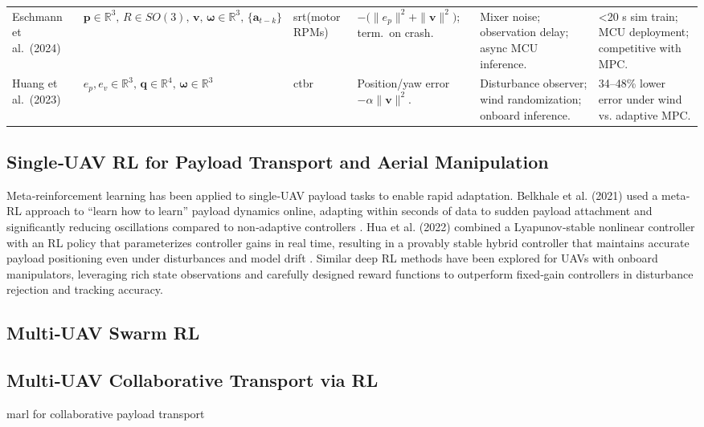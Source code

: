 \begin{table*}[hbt!]
\begin{tabular}{p{2.0cm}<{\raggedright} p{2.5cm}<{\raggedright} p{2.0cm}<{\raggedright} p{3.0cm}<{\raggedright} p{2.8cm}<{\raggedright} p{2.7cm}<{\raggedright}}
Eschmann et al.\ (2024) \cite{eschmann_learning_2024} & $\mathbf{p}\in\mathbb{R}^3,\,R\in SO(3),\,\mathbf{v},\,\boldsymbol{\omega}\in\mathbb{R}^3,\,\{\mathbf{a}_{t-k}\}$ & \gls{srt}(motor RPMs) & { $-\bigl(\|e_p\|^2 + \|\mathbf{v}\|^2\bigr)$; term.\ on crash.} & { Mixer noise; observation delay; async MCU inference.} & { <20 s sim train; MCU deployment; competitive with MPC.} \\[1ex]

Huang et al.\ (2023) \cite{huang_quadswarm_2023} & $e_p,e_v\in\mathbb{R}^3,\,\mathbf{q}\in\mathbb{R}^4,\,\boldsymbol{\omega}\in\mathbb{R}^3$ & \gls{ctbr}& { Position/yaw error $- \alpha\|\mathbf{v}\|^2$.} & { Disturbance observer; wind randomization; onboard inference.} & { 34–48\% lower error under wind vs. adaptive MPC.} \\
\hline
\end{tabular}
\end{table*}

\subsection{Single‐UAV RL for Payload Transport and Aerial Manipulation}
Meta‐reinforcement learning has been applied to single‐UAV payload tasks to enable rapid adaptation. Belkhale et al. (2021) used a meta‐RL approach to “learn how to learn” payload dynamics online, adapting within seconds of data to sudden payload attachment and significantly reducing oscillations compared to non‐adaptive controllers \cite{belkhale_model-based_2021}. Hua et al. (2022) combined a Lyapunov‐stable nonlinear controller with an RL policy that parameterizes controller gains in real time, resulting in a provably stable hybrid controller that maintains accurate payload positioning even under disturbances and model drift \cite{hua_new_2022}. Similar deep RL methods have been explored for UAVs with onboard manipulators, leveraging rich state observations and carefully designed reward functions to outperform fixed‐gain controllers in disturbance rejection and tracking accuracy.\cite{d}
\subsection{Multi‐UAV Swarm RL}
\subsection{Multi‐UAV Collaborative Transport via RL}
\gls{marl} for collaborative payload transport 